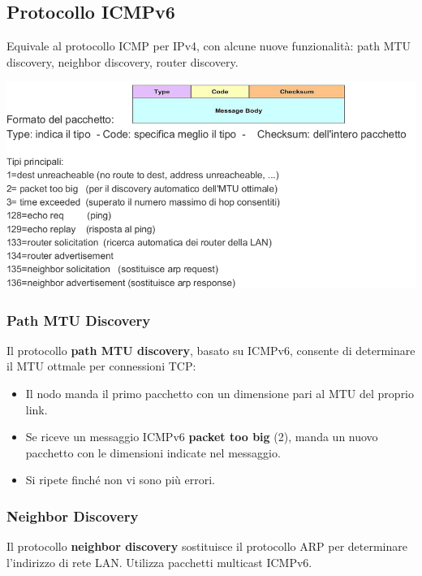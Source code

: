     \newpage
    \subsection{Protocollo ICMPv6}
        Equivale al protocollo ICMP per IPv4, con alcune nuove funzionalità: path MTU discovery, neighbor discovery, router discovery.

        \begin{center}
            \includegraphics[scale=0.39]{chapters/4/assets/schema_l.png}
        \end{center}

        \subsubsection{Path MTU Discovery}
            Il protocollo \textbf{path MTU discovery}, basato su ICMPv6, consente di determinare il MTU ottmale per connessioni TCP:
            \begin{itemize}
                \item Il nodo manda il primo pacchetto con un dimensione pari al MTU del proprio link.
                \item Se riceve un messaggio ICMPv6 \textbf{packet too big} (2), manda un nuovo pacchetto con le dimensioni indicate nel messaggio.
                \item Si ripete finché non vi sono più errori.
            \end{itemize}

        \subsubsection{Neighbor Discovery}
            Il protocollo \textbf{neighbor discovery} sostituisce il protocollo ARP per determinare l'indirizzo di rete LAN. Utilizza pacchetti multicast ICMPv6.

